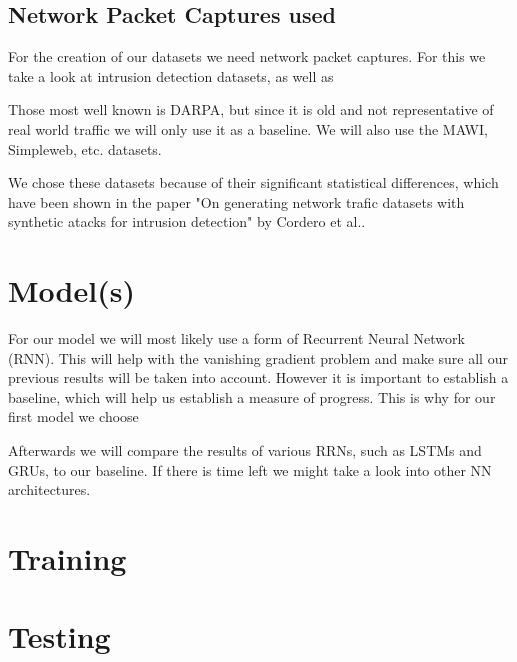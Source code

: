 \documentclass[
	ngerman,
	ruledheaders=section,%
	class=report,%
	thesis={type=bachelor},%
	accentcolor=9c,%
	custommargins=true,%
	marginpar=false,%
	parskip=half-,%
	fontsize=11pt,%
]{tudapub}
\begin{document}

\subsection{Network Packet Captures used}

For the creation of our datasets we need network packet captures.
For this we take a look at intrusion detection datasets,
as well as %

Those most well known is DARPA, but since it is old and not representative of real world traffic we will only use it as a baseline.
We will also use the
MAWI,
Simpleweb,
etc. datasets.


We chose these datasets because of their significant statistical differences, which have been shown in the paper
"On generating network trafic datasets with synthetic atacks for intrusion detection" by Cordero et al..

\section{Model(s)}


For our model we will most likely use a form of Recurrent Neural Network (RNN).
This will help with the vanishing gradient problem and make sure all our previous results will be taken into account.
However it is important to establish a baseline, which will help us establish a measure of progress. %
This is why for our first model we choose %

Afterwards we will compare the results of various RRNs, such as LSTMs and GRUs, to our baseline.
If there is time left we might take a look into other NN architectures. %


\section{Training}

\section{Testing}
\end{document}
